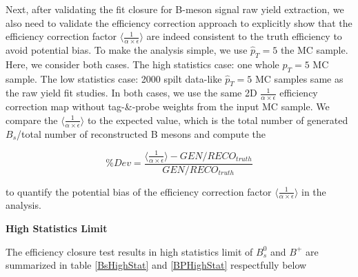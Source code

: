 Next, after validating the fit closure for B-meson signal raw yield extraction, we also need to validate the efficiency correction approach to explicitly show that the efficiency correction factor $\langle\frac{1}{\alpha \times \epsilon} \rangle$ are indeed consistent to the truth efficiency to avoid potential bias. To make the analysis simple, we use $\hat p_T = 5$ the MC sample. Here, we consider both cases. The high statistics case: one whole $\hat p_T = 5$ MC sample. The low statistics case: 2000 spilt data-like $\hat p_T = 5$ MC samples same as the raw yield fit studies. In both cases, we use the same 2D $\frac{1}{\alpha \times \epsilon}$ efficiency correction map without tag-\&-probe weights from the input MC sample. We compare the $\langle \frac{1}{\alpha \times \epsilon}\rangle$ to the expected value, which is the total number of generated $B_s$/total number of reconstructed B mesons and compute the 


\begin{equation}
\% Dev = \frac{\langle \frac{1}{\alpha \times \epsilon} \rangle - GEN/RECO_{truth}}{GEN/RECO_{truth}}
\end{equation}
 
to quantify the potential bias of the efficiency correction factor $\langle \frac{1}{\alpha \times \epsilon} \rangle$ in the analysis. 

\textbf{High Statistics Limit}

The efficiency closure test results in high statistics limit of $B^0_s$ and $B^+$ are summarized in table \ref{BsHighStat} and \ref{BPHighStat} respectfully below


